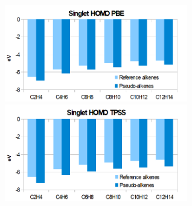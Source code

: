 \documentclass[journal=jctcce,manuscript=article]{achemso}
\begin{document}
\begin{figure}
\includegraphics[width=8cm]{pbe_homo}
\includegraphics[width=8cm]{tpss_homo}
\end{figure}
\end{document}
